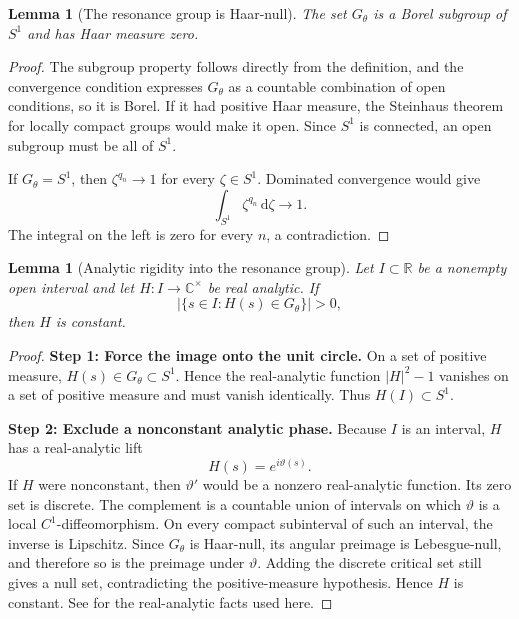 \documentclass[reqno]{amsart}
\newtheorem{lemma}[theorem]{Lemma}
\theoremstyle{remark}
\numberwithin{equation}{section}
\newcommand{\R}{\mathbb{R}}
\newcommand{\C}{\mathbb{C}}
\newcommand{\dd}{\,\mathrm{d}}
\begin{document}
\begin{lemma}[The resonance group is Haar-null]
\label{lem:resonance-null}
The set \(G_\theta\) is a Borel subgroup of \(S^1\) and has Haar measure
zero.
\end{lemma}

\begin{proof}
The subgroup property follows directly from the definition, and the
convergence condition expresses \(G_\theta\) as a countable combination of
open conditions, so it is Borel. If it had positive Haar measure, the
Steinhaus theorem for locally compact groups would make it open. Since
\(S^1\) is connected, an open subgroup must be all of \(S^1\).

If \(G_\theta=S^1\), then \(\zeta^{q_n}\to1\) for every \(\zeta\in S^1\).
Dominated convergence would give
\[
  \int_{S^1}\zeta^{q_n}\dd\zeta\longrightarrow1.
\]
The integral on the left is zero for every \(n\), a contradiction.
\end{proof}

\begin{lemma}[Analytic rigidity into the resonance group]
\label{lem:analytic-rigidity}
Let \(I\subset\R\) be a nonempty open interval and let
\(H:I\to\C^\times\) be real analytic. If
\[
  \bigl|\{s\in I:H(s)\in G_\theta\}\bigr|>0,
\]
then \(H\) is constant.
\end{lemma}

\begin{proof}
\textbf{Step 1: Force the image onto the unit circle.}
On a set of positive measure, \(H(s)\in G_\theta\subset S^1\). Hence the
real-analytic function \(|H|^2-1\) vanishes on a set of positive measure and
must vanish identically. Thus \(H(I)\subset S^1\).

\smallskip
\noindent
\textbf{Step 2: Exclude a nonconstant analytic phase.}
Because \(I\) is an interval, \(H\) has a real-analytic lift
\[
  H(s)=e^{i\vartheta(s)}.
\]
If \(H\) were nonconstant, then \(\vartheta'\) would be a nonzero
real-analytic function. Its zero set is discrete. The complement is a
countable union of intervals on which \(\vartheta\) is a local
\(C^1\)-diffeomorphism. On every compact subinterval of such an interval, the
inverse is Lipschitz. Since \(G_\theta\) is Haar-null, its angular preimage is
Lebesgue-null, and therefore so is the preimage under \(\vartheta\). Adding
the discrete critical set still gives a null set, contradicting the
positive-measure hypothesis. Hence \(H\) is constant. See
\cite{KrantzParks} for the real-analytic facts used here.
\end{proof}
\end{document}
